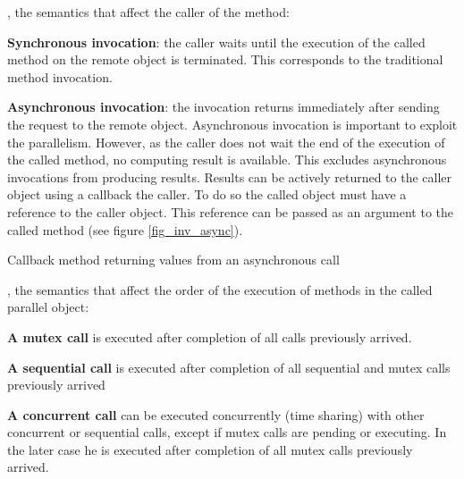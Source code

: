 \begin{petitem}

\item {}, the semantics that affect the caller
of the method:

	\begin{petitem}

	\item \textbf{Synchronous invocation}: the caller waits until the
	execution of the called method on the remote object is terminated.
  This corresponds to the traditional method invocation.

	\item \textbf{Asynchronous invocation}: the invocation returns
	immediately after sending the request to the remote object.
	Asynchronous invocation is important to exploit the parallelism.
	However, as the caller does not wait the end of the execution of the
  called method, no computing result is available. This excludes
  asynchronous invocations from producing results. Results can be
  actively returned to the caller object using a callback the caller.
  To do so the called object must have a reference to the caller object.
  This reference can be passed as an argument to the called method
  (see figure \ref{fig_inv_async}).

	\end{petitem}

{Callback method returning values from an asynchronous call}


\item {}, the semantics that affect the order
 of the execution of methods in the called parallel object:

	\begin{petitem}

	\item \textbf{A mutex call} is executed after completion of all calls previously arrived.
	
	\item \textbf{A sequential call} is executed after completion of all sequential and
	mutex calls previously arrived

	\item \textbf{A concurrent call} can be executed concurrently (time sharing) with other
	concurrent or sequential calls, except if mutex calls are pending or executing.
	In the later case he is executed after completion of all mutex calls previously
	arrived.

	\end{petitem}
\end{petitem}

